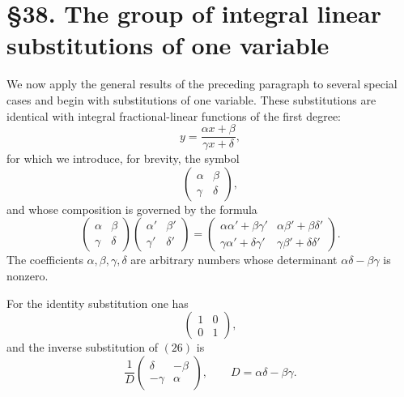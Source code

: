 \documentclass[11pt]{article}
\begin{document}
\section*{\S 38. The group of integral linear substitutions of one variable}

We now apply the general results of the preceding paragraph to several special cases and begin with substitutions of one variable. These substitutions are identical with integral fractional-linear functions of the first degree:
\[
y = \frac{\alpha x + \beta}{\gamma x + \delta},
\tag{26}
\]
for which we introduce, for brevity, the symbol
\[
\begin{pmatrix}
\alpha & \beta\\
\gamma & \delta
\end{pmatrix},
\tag{27}
\]
and whose composition is governed by the formula
\[
\begin{pmatrix}
\alpha & \beta\\
\gamma & \delta
\end{pmatrix}
\begin{pmatrix}
\alpha' & \beta'\\
\gamma' & \delta'
\end{pmatrix}
=
\begin{pmatrix}
\alpha\alpha' + \beta\gamma' & \alpha\beta' + \beta\delta'\\
\gamma\alpha' + \delta\gamma' & \gamma\beta' + \delta\delta'
\end{pmatrix}.
\tag{28}
\]
The coefficients $\alpha,\beta,\gamma,\delta$ are arbitrary numbers whose determinant $\alpha\delta-\beta\gamma$ is nonzero.

For the identity substitution one has
\[
\begin{pmatrix}
1 & 0\\
0 & 1
\end{pmatrix},
\tag{29}
\]
and the inverse substitution of \((26)\) is
\[
\frac{1}{D}
\begin{pmatrix}
\delta & -\beta\\
-\gamma & \alpha
\end{pmatrix},
\qquad D=\alpha\delta-\beta\gamma.
\tag{30}
\]
\end{document}
